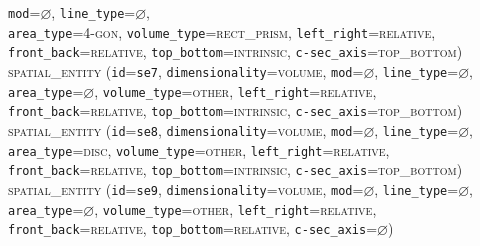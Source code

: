 \documentclass[11pt]{article}
\begin{document}
{            \texttt{mod}=$\varnothing$,
            \texttt{line\_type}=$\varnothing$,\\
            \texttt{area\_type}=\textsc{4-gon},
            \texttt{volume\_type}=\textsc{rect\_prism},
            \texttt{left\_right}=\textsc{relative},\\
            \texttt{front\_back}=\textsc{relative},
            \texttt{top\_bottom}=\textsc{intrinsic},
            \texttt{c-sec\_axis}=\textsc{top\_bottom})\vspace{0.5em}\\
        \textsc{spatial\_entity}
            (\texttt{id}=\texttt{se7},
            \texttt{dimensionality}=\textsc{volume},
            \texttt{mod}=$\varnothing$,
            \texttt{line\_type}=$\varnothing$,\\
            \texttt{area\_type}=$\varnothing$,
            \texttt{volume\_type}=\textsc{other},
            \texttt{left\_right}=\textsc{relative},\\
            \texttt{front\_back}=\textsc{relative},
            \texttt{top\_bottom}=\textsc{intrinsic},
            \texttt{c-sec\_axis}=\textsc{top\_bottom})\vspace{0.5em}\\
        \textsc{spatial\_entity}
            (\texttt{id}=\texttt{se8},
            \texttt{dimensionality}=\textsc{volume},
            \texttt{mod}=$\varnothing$,
            \texttt{line\_type}=$\varnothing$,\\
            \texttt{area\_type}=\textsc{disc},
            \texttt{volume\_type}=\textsc{other},
            \texttt{left\_right}=\textsc{relative},\\
            \texttt{front\_back}=\textsc{relative},
            \texttt{top\_bottom}=\textsc{intrinsic},
            \texttt{c-sec\_axis}=\textsc{top\_bottom})\vspace{0.5em}\\
        \textsc{spatial\_entity}
            (\texttt{id}=\texttt{se9},
            \texttt{dimensionality}=\textsc{volume},
            \texttt{mod}=$\varnothing$,
            \texttt{line\_type}=$\varnothing$,\\
            \texttt{area\_type}=$\varnothing$,
            \texttt{volume\_type}=\textsc{other},
            \texttt{left\_right}=\textsc{relative},\\
            \texttt{front\_back}=\textsc{relative},
            \texttt{top\_bottom}=\textsc{relative},
            \texttt{c-sec\_axis}=$\varnothing$)\vspace{0.5em}\\
}
\end{document}
